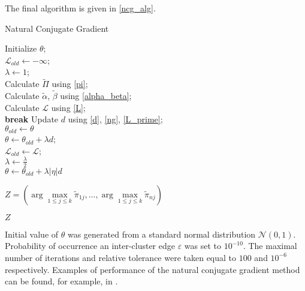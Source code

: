 The final algorithm is given in \ref{ncg_alg}.

\begin{algorithm}[H]
    \caption{Natural Conjugate Gradient}
    \label{ncg_alg}
	\SetAlgoLined

	Initialize $\theta$; \\
    $\mathcal L_{old} \leftarrow -\infty$; \\
    $\lambda \leftarrow 1$; \\

    {
        Calculate $\tilde\Pi$ using \ref{pi}; \\
        Calculate $\tilde\alpha$, $\tilde\beta$ using \ref{alpha_beta}; \\
        Calculate $\mathcal L$ using \ref{L}; \\

            {
                \bf break
            }
            {
                Update $d$ using \ref{d}, \ref{ng}, \ref{L_prime}; \\
                $\theta_{old} \leftarrow \theta$ \\
                $\theta \leftarrow \theta_{old} + \lambda d$; \\
                $\mathcal L_{old} \leftarrow \mathcal L$; \\
            }
            {
                $\lambda \leftarrow \frac\lambda2$ \\
                $\theta \leftarrow \theta_{old} + \lambda |\eta| d$ \\
            }
    }

    $Z = \left( \arg\max\limits_{1\leq j \leq k} \tilde\pi_{1j}, \dots, \arg\max\limits_{1\leq j \leq k} \tilde\pi_{nj} \right)$

    \Return $Z$	
\end{algorithm}

Initial value of $\theta$ was generated from a standard normal distribution $\mathcal N(0, 1)$.
Probability of occurrence an inter-cluster edge $\varepsilon$ was set to $10^{-10}$.
The maximal number of iterations and relative tolerance were taken equal to $100$ and $10^{-6}$ respectively.
Examples of performance of the natural conjugate gradient method can be found, for example, in \cite{ncg}.